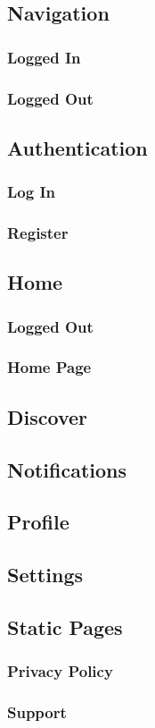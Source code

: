 \subsection{Navigation}
\subsubsection{Logged In}
\subsubsection{Logged Out}
\subsection{Authentication}
\subsubsection{Log In}
\subsubsection{Register}
\subsection{Home}
\subsubsection{Logged Out}
\subsubsection{Home Page}
\subsection{Discover}
\subsection{Notifications}
\subsection{Profile}
\subsection{Settings}
\subsection{Static Pages}
\subsubsection{Privacy Policy}
\subsubsection{Support}